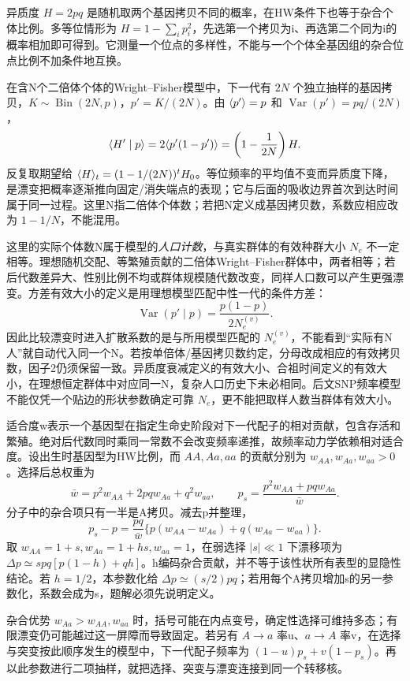 异质度 $H=2pq$ 是随机取两个基因拷贝不同的概率，在HW条件下也等于杂合个体比例。多等位情形为 $H=1-\sum_i p_i^2$，先选第一个拷贝为i、再选第二个同为i的概率相加即可得到。它测量一个位点的多样性，不能与一个个体全基因组的杂合位点比例不加条件地互换。

在含N个二倍体个体的Wright--Fisher模型中，下一代有 $2N$ 个独立抽样的基因拷贝，$K\sim\operatorname{Bin}(2N,p)$，$p'=K/(2N)$。由 $\langle p'\rangle=p$ 和 $\operatorname{Var}(p')=pq/(2N)$，
\[
 \langle H'\mid p\rangle=2\langle p'(1-p')\rangle=\left(1-\frac1{2N}\right)H.
\]
反复取期望给 $\langle H\rangle_t=(1-1/(2N))^t H_0$。等位频率的平均值不变而异质度下降，是漂变把概率逐渐推向固定/消失端点的表现；它与后面的吸收边界首次到达时间属于同一过程。这里N指二倍体个体数；若把N定义成基因拷贝数，系数应相应改为 $1-1/N$，不能混用。

这里的实际个体数N属于模型的\emph{人口计数}，与真实群体的有效种群大小 $N_e$ 不一定相等。理想随机交配、等繁殖贡献的二倍体Wright--Fisher群体中，两者相等；若后代数差异大、性别比例不均或群体规模随代数改变，同样人口数可以产生更强漂变。方差有效大小的定义是用理想模型匹配中性一代的条件方差：
\[
 \operatorname{Var}(p'\mid p)=\frac{p(1-p)}{2N_e^{(v)}}.
\]
因此比较漂变时进入扩散系数的是与所用模型匹配的 $N_e^{(v)}$，不能看到“实际有N人”就自动代入同一个N。若按单倍体/基因拷贝数约定，分母改成相应的有效拷贝数，因子2仍须保留一致。异质度衰减定义的有效大小、合祖时间定义的有效大小，在理想恒定群体中对应同一N，复杂人口历史下未必相同。后文SNP频率模型不能仅凭一个贴边的形状参数确定可靠 $N_e$，更不能把取样人数当群体有效大小。

适合度w表示一个基因型在指定生命史阶段对下一代配子的相对贡献，包含存活和繁殖。绝对后代数同时乘同一常数不会改变频率递推，故频率动力学依赖相对适合度。设出生时基因型为HW比例，而 $AA,Aa,aa$ 的贡献分别为 $w_{AA},w_{Aa},w_{aa}>0$。选择后总权重为
\[
 \bar w=p^2w_{AA}+2pqw_{Aa}+q^2w_{aa},\qquad
 p_s=\frac{p^2w_{AA}+pqw_{Aa}}{\bar w}.
\]
分子中的杂合项只有一半是A拷贝。减去p并整理，
\[
 p_s-p=\frac{pq}{\bar w}\{p(w_{AA}-w_{Aa})+q(w_{Aa}-w_{aa})\}.
\]
取 $w_{AA}=1+s,w_{Aa}=1+hs,w_{aa}=1$，在弱选择 $|s|\ll1$ 下漂移项为 $\Delta p\simeq spq[p(1-h)+qh]$。h编码杂合贡献，并不等于该性状所有表型的显隐性结论。若 $h=1/2$，本参数化给 $\Delta p\simeq(s/2)pq$；若用每个A拷贝增加s的另一参数化，系数会成为s，题解必须先说明定义。

杂合优势 $w_{Aa}>w_{AA},w_{aa}$ 时，括号可能在内点变号，确定性选择可维持多态；有限漂变仍可能越过这一屏障而导致固定。若另有 $A\to a$ 率u、$a\to A$ 率v，在选择与突变按此顺序发生的模型中，下一代配子频率为 $(1-u)p_s+v(1-p_s)$。再以此参数进行二项抽样，就把选择、突变与漂变连接到同一个转移核。

